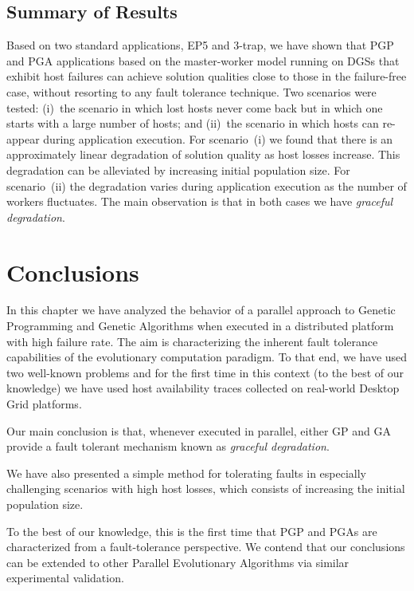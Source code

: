 \documentclass[graybox]{sty/svmult}
\begin{document}
\subsection{Summary of Results}
\label{summary}

Based on two standard applications, EP5 and 3-trap,  we have shown that
PGP and PGA applications based on the master-worker model running on DGSs
that exhibit host failures can achieve solution qualities close to
those in the failure-free case, without resorting to any fault
tolerance technique.  Two scenarios were tested: (i)~the scenario in
which lost hosts never come back but in which one starts with a large
number of hosts; and (ii)~the scenario in which hosts can re-appear
during application execution.  For scenario~(i) we found that there is
an approximately linear degradation of solution quality as host losses
increase. This degradation can be alleviated by increasing initial
population size.  For scenario~(ii) the degradation varies during
application execution as the number of workers fluctuates.  The main observation
is that in both cases we have \emph{graceful degradation}.

\section{Conclusions} 
\label{conclusions}
In this chapter we have analyzed the behavior of a parallel approach to Genetic
Programming and Genetic Algorithms when executed in a distributed platform with
high failure rate. The aim is characterizing the inherent fault
tolerance capabilities of the evolutionary computation paradigm. To that end, we have used two well-known problems and for the first time in this
context (to the best of our knowledge) we have used host availability traces collected on real-world Desktop Grid platforms.

Our main conclusion is that, whenever executed in parallel, either GP and GA provide a fault tolerant mechanism known as \emph{graceful degradation}. 

We have also presented a simple method for tolerating faults in especially challenging scenarios with high host losses, which consists of increasing the initial population size. 


To the best of our knowledge, this is the first time that PGP and PGAs are
characterized from a fault-tolerance perspective.  We contend that our
conclusions can be extended to other Parallel Evolutionary Algorithms 
via similar experimental validation. 



\end{document}
